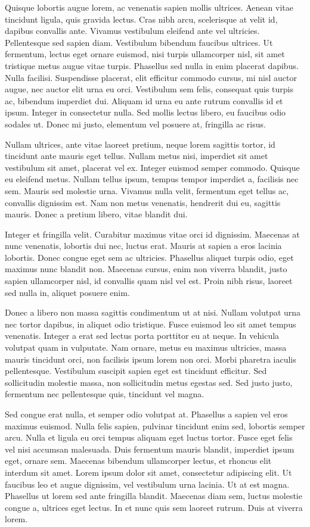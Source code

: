 Quisque lobortis augue lorem, ac venenatis sapien mollis ultrices. Aenean vitae tincidunt ligula, quis gravida lectus. Cras nibh arcu, scelerisque at velit id, dapibus convallis ante. Vivamus vestibulum eleifend ante vel ultricies. Pellentesque sed sapien diam. Vestibulum bibendum faucibus ultrices. Ut fermentum, lectus eget ornare euismod, nisi turpis ullamcorper nisl, sit amet tristique metus augue vitae turpis. Phasellus sed nulla in enim placerat dapibus. Nulla facilisi. Suspendisse placerat, elit efficitur commodo cursus, mi nisl auctor augue, nec auctor elit urna eu orci. Vestibulum sem felis, consequat quis turpis ac, bibendum imperdiet dui. Aliquam id urna eu ante rutrum convallis id et ipsum. Integer in consectetur nulla. Sed mollis lectus libero, eu faucibus odio sodales ut. Donec mi justo, elementum vel posuere at, fringilla ac risus.

Nullam ultrices, ante vitae laoreet pretium, neque lorem sagittis tortor, id tincidunt ante mauris eget tellus. Nullam metus nisi, imperdiet sit amet vestibulum sit amet, placerat vel ex. Integer euismod semper commodo. Quisque eu eleifend metus. Nullam tellus ipsum, tempus tempor imperdiet a, facilisis nec sem. Mauris sed molestie urna. Vivamus nulla velit, fermentum eget tellus ac, convallis dignissim est. Nam non metus venenatis, hendrerit dui eu, sagittis mauris. Donec a pretium libero, vitae blandit dui.

Integer et fringilla velit. Curabitur maximus vitae orci id dignissim. Maecenas at nunc venenatis, lobortis dui nec, luctus erat. Mauris at sapien a eros lacinia lobortis. Donec congue eget sem ac ultricies. Phasellus aliquet turpis odio, eget maximus nunc blandit non. Maecenas cursus, enim non viverra blandit, justo sapien ullamcorper nisl, id convallis quam nisl vel est. Proin nibh risus, laoreet sed nulla in, aliquet posuere enim.

Donec a libero non massa sagittis condimentum ut at nisi. Nullam volutpat urna nec tortor dapibus, in aliquet odio tristique. Fusce euismod leo sit amet tempus venenatis. Integer a erat sed lectus porta porttitor eu at neque. In vehicula volutpat quam in vulputate. Nam ornare, metus eu maximus ultricies, massa mauris tincidunt orci, non facilisis ipsum lorem non orci. Morbi pharetra iaculis pellentesque. Vestibulum suscipit sapien eget est tincidunt efficitur. Sed sollicitudin molestie massa, non sollicitudin metus egestas sed. Sed justo justo, fermentum nec pellentesque quis, tincidunt vel magna.

Sed congue erat nulla, et semper odio volutpat at. Phasellus a sapien vel eros maximus euismod. Nulla felis sapien, pulvinar tincidunt enim sed, lobortis semper arcu. Nulla et ligula eu orci tempus aliquam eget luctus tortor. Fusce eget felis vel nisi accumsan malesuada. Duis fermentum mauris blandit, imperdiet ipsum eget, ornare sem. Maecenas bibendum ullamcorper lectus, et rhoncus elit interdum sit amet. Lorem ipsum dolor sit amet, consectetur adipiscing elit. Ut faucibus leo et augue dignissim, vel vestibulum urna lacinia. Ut at est magna. Phasellus ut lorem sed ante fringilla blandit. Maecenas diam sem, luctus molestie congue a, ultrices eget lectus. In et nunc quis sem laoreet rutrum. Duis at viverra lorem.

